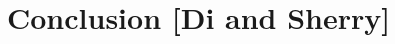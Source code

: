 \documentclass[
  number,
  preprint,
  3p]{elsarticle}
\begin{document}
\begin{longtable}[]
\end{longtable}

\section{Conclusion {[}Di and Sherry{]}}\label{sec-conclusion}


\renewcommand\refname{References}
  
\end{document}
